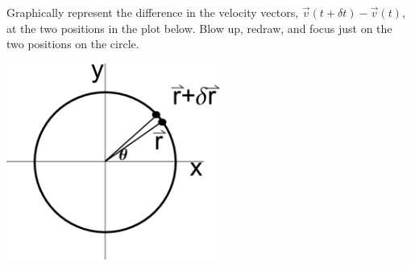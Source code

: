 \begin{problem}
\begin{subproblem}
    \vfill

  \item Graphically represent the difference in the velocity vectors,
    $\vec{v}(t+\delta t)-\vec{v}(t)$, at the two positions in the plot
    below. Blow up, redraw, and focus just on the two positions on the
    circle.

    \includegraphics[width=7cm]{ink/week12/circularAcceleration}

    \vfill

  \end{subproblem}

\end{problem}


